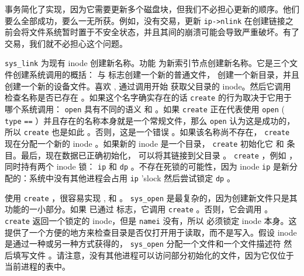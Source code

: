 事务简化了实现，因为它需要更新多个磁盘块，但我们不必担心更新的顺序。他们要么全部成功，要么一无所获。例如，没有交易，更新
    \lstinline{ip->nlink}    在创建链接之前会将文件系统暂时置于不安全状态，并且其间的崩溃可能会导致严重破坏。有了交易，我们就不必担心这个问题。  

   \lstinline{sys_link}    为现有 inode 创建新名称。功能
        为新索引节点创建新名称。它是三个文件创建系统调用的概括：
        与
        标志创建一个新的普通文件，
        创建一个新目录，并且
        创建一个新的设备文件。喜欢
        ,
        通过调用开始
        获取父目录的 inode。然后它调用
        检查名称是否已存在
        。如果这个名字确实存在的话
    \lstinline{create}    的行为取决于它用于哪个系统调用：
    \lstinline{open}    具有不同的语义
        和
        。如果
    \lstinline{create}    正在代表使用
    \lstinline{open}    (    \lstinline{type}   
    \lstinline{==}   
        ）并且存在的名称本身就是一个常规文件，那么
    \lstinline{open}    认为这是成功的，所以
    \lstinline{create}    也是如此
        。否则，这是一个错误
        。如果该名称尚不存在，
    \lstinline{create}    现在分配一个新的 inode
        。如果新的 inode 是一个目录，
    \lstinline{create}    初始化它
        和
        条目。最后，现在数据已正确初始化，
       可以将其链接到父目录
        。
    \lstinline{create}    ，例如
        ，同时持有两个 inode 锁：
    \lstinline{ip}    和
    \lstinline{dp}   。不存在死锁的可能性，因为 inode
    \lstinline{ip}    是新分配的：系统中没有其他进程会占用
    \lstinline{ip}    'slock 然后尝试锁定
    \lstinline{dp}    。  

使用
    \lstinline{create}    ，很容易实现
        ,
        和
        。
    \lstinline{sys_open}   
        是最复杂的，因为创建新文件只是其功能的一小部分。如果
        已通过
        标志，它调用
    \lstinline{create}   
        。否则，它会调用
        。
    \lstinline{create}    返回一个锁定的 inode，但是
    \lstinline{namei}    没有，所以
        必须锁定 inode 本身。这提供了一个方便的地方来检查目录是否仅打开用于读取，而不是写入。假设 inode 是通过一种或另一种方式获得的，
    \lstinline{sys_open}    分配一个文件和一个文件描述符
        然后填写文件
        。请注意，没有其他进程可以访问部分初始化的文件，因为它仅位于当前进程的表中。  

